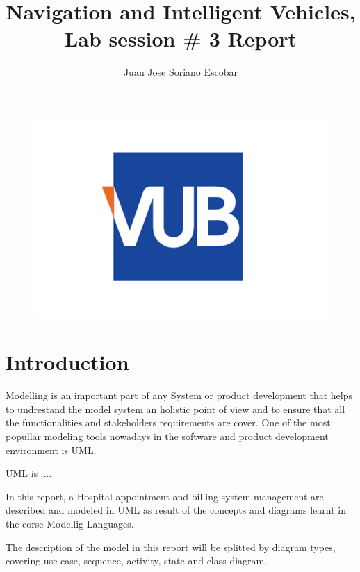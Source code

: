 \documentclass{article}
\begin{document}
        \begin{figure}
            \centering
            \includegraphics[width=0.5\linewidth]{./img/vub.png}
        \end{figure}
        \title{Navigation and Intelligent Vehicles, Lab session # 3 Report}
        \author{Juan Jose Soriano Escobar }
        \maketitle
        \newpage

        \tableofcontents
        \newpage
    
        \begin{appendix}
            \listoffigures
          \end{appendix}
          \newpage
    
    
            \section{Introduction}
            Modelling is an important part of any System or product development that helps to undrestand the model system an holistic point of view and to ensure that all the functionalities and
            stakeholders requirements are cover. One of the most popullar modeling tools nowadays in the software and product development environment is UML.

            UML is ....

            In this report, a Hospital appointment and billing system management are described and modeled in UML as result of the concepts and diagrams learnt in the corse Modellig Languages.

            The description of the model in this report will be splitted by diagram types, covering use case, sequence, activity, state and class diagram.
             
            \newpage         
\end{document}
